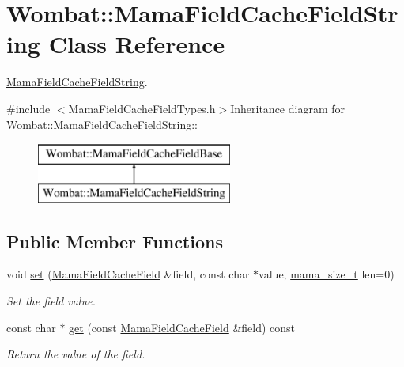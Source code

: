 \hypertarget{classWombat_1_1MamaFieldCacheFieldString}{
\section{Wombat::MamaFieldCacheFieldString Class Reference}
\label{classWombat_1_1MamaFieldCacheFieldString}
}


\hyperlink{classWombat_1_1MamaFieldCacheFieldString}{MamaFieldCacheFieldString}.  


{\ttfamily \#include $<$MamaFieldCacheFieldTypes.h$>$}Inheritance diagram for Wombat::MamaFieldCacheFieldString::\begin{figure}[H]
\begin{center}
\leavevmode
\includegraphics[height=2cm]{classWombat_1_1MamaFieldCacheFieldString}
\end{center}
\end{figure}
\subsection*{Public Member Functions}
\begin{DoxyCompactItemize}
\item 
void \hyperlink{classWombat_1_1MamaFieldCacheFieldString_a2272ccc85a4c5abbd705b77e8333e79b}{set} (\hyperlink{classWombat_1_1MamaFieldCacheField}{MamaFieldCacheField} \&field, const char $\ast$value, \hyperlink{classmama__size__t}{mama\_\-size\_\-t} len=0)
\begin{DoxyCompactList}\small\item\em Set the field value. \item\end{DoxyCompactList}\item 
const char $\ast$ \hyperlink{classWombat_1_1MamaFieldCacheFieldString_ab803ba919dab54906b2baedaf656a05a}{get} (const \hyperlink{classWombat_1_1MamaFieldCacheField}{MamaFieldCacheField} \&field) const 
\begin{DoxyCompactList}\small\item\em Return the value of the field. \item\end{DoxyCompactList}\end{DoxyCompactItemize}
